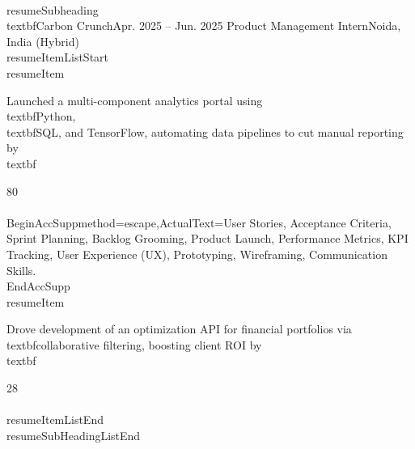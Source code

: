 \documentclass[a4paper]{extarticle}
\makeatletter
\renewcommand\normalsize{\fontsize{10}{11.8}\selectfont}
\newcommand{\resumeItem}[1]{
  \item\normalsize{
    {#1 \vspace{-2pt}}
  }
}
\newcommand{\resumeSubheading}[4]{
  \vspace{-2pt}\item
    \begin{tabular*}{1.0\textwidth}[t]{l@{\extracolsep{\fill}}r}
      \textbf{#1} & \textbf{\small #2} \
      \textit{\small#3} & \textit{\small #4} \
    \end{tabular*}\vspace{-7pt}
}
\newcommand{\resumeSubHeadingListEnd}{\end{itemize}}
\newcommand{\resumeItemListStart}{\begin{itemize}}
\newcommand{\resumeItemListEnd}{\end{itemize}\vspace{-5pt}}
\makeatother
\begin{document}
{{{{    \\resumeSubheading
    {\\textbf{Carbon Crunch}}{Apr. 2025 -- Jun. 2025}
    {Product Management Intern}{Noida, India (Hybrid)}
    \\resumeItemListStart
        \\resumeItem{Launched a multi-component analytics portal using \\textbf{Python}, \\textbf{SQL}, and TensorFlow, automating data pipelines to cut manual reporting by \\textbf{80\\%
        \\BeginAccSupp{method=escape,ActualText={User Stories, Acceptance Criteria, Sprint Planning, Backlog Grooming, Product Launch, Performance Metrics, KPI Tracking, User Experience (UX), Prototyping, Wireframing, Communication Skills.}}\hspace{0pt}\\EndAccSupp{}
        \\resumeItem{Drove development of an optimization API for financial portfolios via \\textbf{collaborative filtering}, boosting client ROI by \\textbf{28\\%
    \\resumeItemListEnd
\\resumeSubHeadingListEnd

}}}}}}}}
\end{document}
